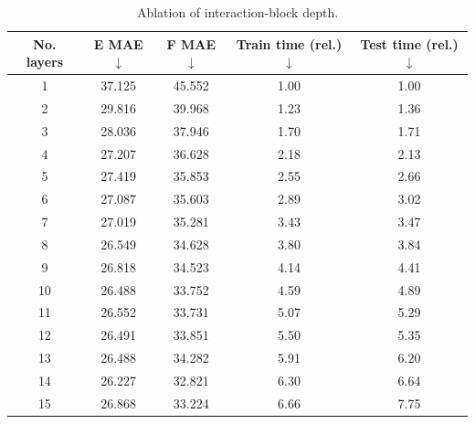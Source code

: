 \begin{table}[ht]
    \centering
    \scriptsize
    \caption{Ablation of interaction-block depth.}
    \label{tab:sm_layers}
    \begin{tabular*}{\linewidth}{@{\extracolsep{\fill}}ccccc@{}}
        \toprule
        \textbf{No. layers}               &
        \textbf{E MAE}$\downarrow$        &
        \textbf{F MAE}$\downarrow$        &
        \textbf{Train time (rel.)}$\downarrow$ &
        \textbf{Test time (rel.)}$\downarrow$                             \\
        \midrule
        1                                 & 37.125 & 45.552 & 1.00 & 1.00 \\
        2                                 & 29.816 & 39.968 & 1.23 & 1.36 \\
        3                                 & 28.036 & 37.946 & 1.70 & 1.71 \\
        4                                 & 27.207 & 36.628 & 2.18 & 2.13 \\
        5                                 & 27.419 & 35.853 & 2.55 & 2.66 \\
        6                                 & 27.087 & 35.603 & 2.89 & 3.02 \\
        7                                 & 27.019 & 35.281 & 3.43 & 3.47 \\
        8                                 & 26.549 & 34.628 & 3.80 & 3.84 \\
        9                                 & 26.818 & 34.523 & 4.14 & 4.41 \\
        10                                & 26.488 & 33.752 & 4.59 & 4.89 \\
        11                                & 26.552 & 33.731 & 5.07 & 5.29 \\
        12                                & 26.491 & 33.851 & 5.50 & 5.35 \\
        13                                & 26.488 & 34.282 & 5.91 & 6.20 \\
        14                                & 26.227 & 32.821 & 6.30 & 6.64 \\
        15                                & 26.868 & 33.224 & 6.66 & 7.75 \\
        \bottomrule
    \end{tabular*}
\end{table}

